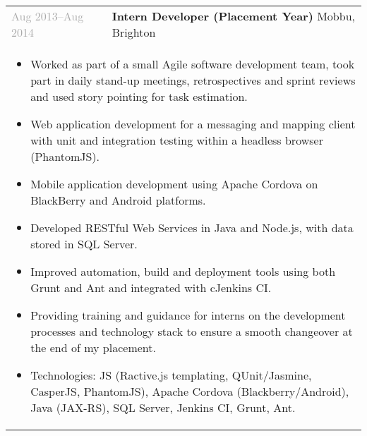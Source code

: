 \documentclass{article}
\newenvironment{exptable}{
  \begin{longtable}{lp{0.8\textwidth}}
  }{
  \end{longtable}
}
\begin{document}
\begin{exptable}
      \textcolor{darkgray}{Aug 2013--Aug 2014} & \textbf{Intern Developer (Placement Year)} Mobbu, Brighton \\
      \multicolumn{2}{p{\textwidth}}{
        \begin{itemize}
          \item Worked as part of a small Agile software development team, took part in daily stand-up meetings, retrospectives and sprint reviews and used story pointing for task estimation.
          \item Web application development for a messaging and mapping client with unit and integration testing within a headless browser (PhantomJS).
          \item Mobile application development using Apache Cordova on BlackBerry and Android platforms.
          \item Developed RESTful Web Services in Java and Node.js, with data stored in SQL Server.
          \item Improved automation, build and deployment tools using both Grunt and Ant and integrated with cJenkins CI.
          \item Providing training and guidance for interns on the development processes and technology stack to ensure a smooth changeover at the end of my placement.
        \end{itemize}

        \vspace{1em}

        \begin{itemize}[leftmargin=1em]
          \item[] Technologies: JS (Ractive.js templating, QUnit/Jasmine, CasperJS, PhantomJS), Apache Cordova (Blackberry/Android), Java (JAX-RS), SQL Server, Jenkins CI, Grunt, Ant.
        \end{itemize}
      } \\
    \end{exptable}

  \vspace{-1em}
\end{document}
